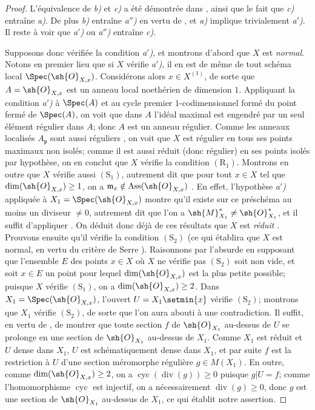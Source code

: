 \begin{proof}
L'équivalence de \emph{b)} et \emph{c)} a été démontrée dans , ainsi que le fait que \emph{c)} entraîne \emph{a)}.
De plus \emph{b)} entraîne \emph{a$''$)} en vertu de , et \emph{a)} implique trivialement \emph{a$'$)}.
Il reste à voir que \emph{a$'$)} ou \emph{a$''$)} entraîne \emph{c)}.

Supposons donc vérifiée la condition \emph{a$'$)}, et montrons d'abord que $X$ est \emph{normal}.
Notons en premier lieu que si $X$ vérifie \emph{a$'$)}, il en est de même de tout schéma local $\Spec(\sh{O}_{X,x})$.
Considérons alors $x\in X^{(1)}$, de sorte que $A=\sh{O}_{X,x}$ est un anneau local noethérien de dimension $1$.
Appliquant la condition \emph{a$'$)} à $\Spec(A)$ et au cycle premier $1$-codimensionnel formé du point fermé de $\Spec(A)$, on voit que dans $A$ l'idéal maximal est engendré par un seul élément régulier dans $A$;
donc  $A$ est un anneau régulier.
Comme les anneaux localisés $A_{\mathfrak p}$ sont aussi réguliers , on voit que $X$ est régulier en tous ses points maximaux non isolés;
comme il est aussi réduit (donc régulier) en ses points isolés par hypothèse, on en conclut que $X$ vérifie la condition $(\mathrm{R}_1)$.
Montrons en outre que $X$ vérifie aussi $(\mathrm{S}_1)$, autrement dit que pour tout $x\in X$ tel que $\dim(\sh{O}_{X,x})\geq1$, on a $\mathfrak{m}_x\notin\operatorname{Ass}(\sh{O}_{X,x})$ .
En effet, l'hypothèse \emph{a$'$)} appliquée à $X_1=\Spec(\sh{O}_{X,x})$ montre qu'il existe sur ce préschéma au moins un diviseur $\neq0$, autrement dit que l'on a $\sh{M}_{X_1}^*\neq\sh{O}_{X_1}^*$, et il suffit d'appliquer .
On déduit donc déjà de ces résultats que $X$ est \emph{réduit} .
Prouvons ensuite qu'il vérifie la condition $(\mathrm{S}_2)$ (ce qui établira que $X$ est normal, en vertu du critère de Serre ).
Raisonnons par l'absurde en supposant que l'ensemble $E$ des points $x\in X$ où $X$ ne vérifie pas $(\mathrm{S}_2)$ soit non vide, et soit $x\in E$ un point pour lequel $\dim(\sh{O}_{X,x})$ est la plus petite possible;
puisque $X$ vérifie $(\mathrm{S}_1)$, on a $\dim(\sh{O}_{X,x})\geq2$.
Dans $X_1=\Spec(\sh{O}_{X,x})$, l'ouvert $U=X_1\setmin\{x\}$ vérifie $(\mathrm{S}_2)$;
montrons que $X_1$ vérifie $(\mathrm{S}_2)$, de sorte que l'on aura abouti à une contradiction.
Il suffit, en vertu de , de montrer que toute section $f$ de $\sh{O}_{X_1}$ au-dessus de $U$ se prolonge en une section de $\sh{O}_{X_1}$ au-dessus de $X_1$.
Comme $X_1$ est réduit et $U$ dense dans $X_1$, $U$ est schématiquement dense dans $X_1$, et par suite $f$ est la restriction à $U$ d'une section méromorphe régulière $g\in M(X_1)$.
En outre, comme $\dim(\sh{O}_{X,x})\geq2$, on a $\operatorname{cyc}(\operatorname{div}(g))\geq0$ puisque $g|U=f$;
comme l'homomorphisme $\operatorname{cyc}$ est injectif, on a nécessairement $\operatorname{div}(g)\geq0$, donc  $g$ est une section de $\sh{O}_{X_1}$ au-dessus de $X_1$, ce qui établit notre assertion.


\end{proof}
